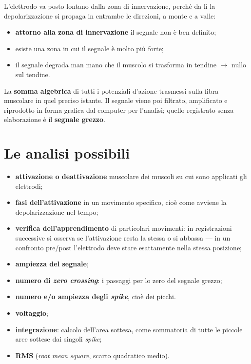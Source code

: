 L'elettrodo va posto lontano dalla zona di innervazione, perché da lì la depolarizzazione si propaga
in entrambe le direzioni, a monte e a valle:
\begin{itemize}
  \item \textbf{attorno alla zona di innervazione} il segnale non è ben definito;
  \item esiste una zona in cui il segnale è molto più forte;
  \item il segnale degrada man mano che il muscolo si trasforma in tendine $\rightarrow$ nullo sul
    tendine.
\end{itemize}

La \textbf{somma algebrica} di tutti i potenziali d'azione trasmessi sulla fibra muscolare in quel
preciso istante. Il segnale viene poi filtrato, amplificato e riprodotto in forma grafica dal
computer per l'analisi; quello registrato senza elaborazione è il \textbf{segnale grezzo}.

\section{Le analisi possibili}

\begin{itemize}
  \item \textbf{attivazione o deattivazione} muscolare dei muscoli su cui sono applicati gli
    elettrodi;
  \item \textbf{fasi dell'attivazione} in un movimento specifico, cioè come avviene la
    depolarizzazione nel tempo;
  \item \textbf{verifica dell'apprendimento} di particolari movimenti: in registrazioni successive
    si osserva se l'attivazione resta la stessa o si abbassa --- in un confronto pre/post
    l'elettrodo deve stare esattamente nella stessa posizione;
  \item \textbf{ampiezza del segnale};
  \item \textbf{numero di \textit{zero crossing}}: i passaggi per lo zero del segnale grezzo;
  \item \textbf{numero e/o ampiezza degli \textit{spike}}, cioè dei picchi.
\end{itemize}

\begin{itemize}
  \item \textbf{voltaggio};
  \item \textbf{integrazione}: calcolo dell'area sottesa, come sommatoria di tutte le piccole aree
    sottese dai singoli \textit{spike};
  \item \textbf{RMS} (\textit{root mean square}, scarto quadratico medio).
\end{itemize}

